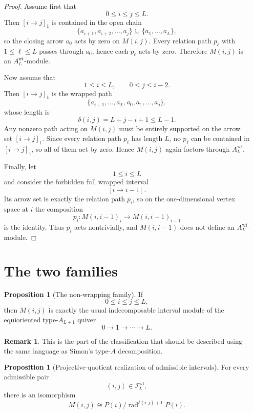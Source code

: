 \documentclass{article}
\newcommand{\rad}{\operatorname{rad}}
\theoremstyle{definition}
\newtheorem{proposition}[theorem]{Proposition}
\newtheorem{remark}[theorem]{Remark}
\begin{document}
\begin{proof}
Assume first that
\[
0\le i\le j\le L.
\]
Then $[i\to j]_1$ is contained in the open chain
\[
\{a_{i+1},a_{i+2},\dots,a_j\}\subseteq \{a_1,\dots,a_L\},
\]
so the closing arrow $a_0$ acts by zero on $M(i,j)$. Every relation path
$p_\ell$ with $1\le \ell\le L$ passes through $a_0$, hence each $p_\ell$ acts
by zero. Therefore $M(i,j)$ is an $A_L^{\mathrm{wt}}$-module.

Now assume that
\[
1\le i\le L,
\qquad
0\le j\le i-2.
\]
Then $[i\to j]_1$ is the wrapped path
\[
\{a_{i+1},\dots,a_L,a_0,a_1,\dots,a_j\},
\]
whose length is
\[
\delta(i,j)=L+j-i+1\le L-1.
\]
Any nonzero path acting on $M(i,j)$ must be entirely supported on the arrow set
$[i\to j]_1$. Since every relation path $p_\ell$ has length $L$, no $p_\ell$
can be contained in $[i\to j]_1$, so all of them act by zero. Hence
$M(i,j)$ again factors through $A_L^{\mathrm{wt}}$.

Finally, let
\[
1\le i\le L
\]
and consider the forbidden full wrapped interval
\[
[i\to i-1].
\]
Its arrow set is exactly the relation path $p_i$, so on the one-dimensional
vertex space at $i$ the composition
\[
p_i:M(i,i-1)_i\to M(i,i-1)_{i-1}
\]
is the identity. Thus $p_i$ acts nontrivially, and $M(i,i-1)$ does not define
an $A_L^{\mathrm{wt}}$-module.
\end{proof}

\section{The two families}

\begin{proposition}[The non-wrapping family]
If
\[
0\le i\le j\le L,
\]
then $M(i,j)$ is exactly the usual indecomposable interval module of the
equioriented type-$A_{L+1}$ quiver
\[
0\to 1\to \cdots \to L.
\]
\end{proposition}

\begin{remark}
This is the part of the classification that should be described using the same
language as Simon's type-$A$ decomposition.
\end{remark}

\begin{proposition}[Projective-quotient realization of admissible intervals]
For every admissible pair
\[
(i,j)\in \mathcal I_L^{\mathrm{wt}},
\]
there is an isomorphism
\[
M(i,j)\cong P(i)/\rad^{\delta(i,j)+1}P(i).
\]
\end{proposition}
\end{document}
